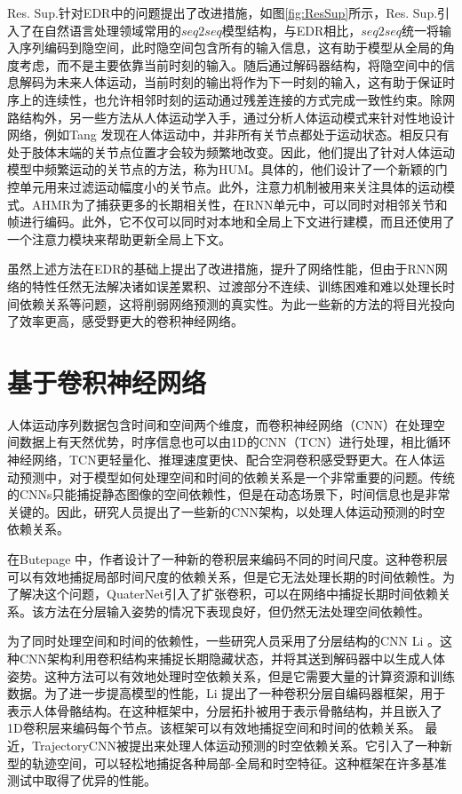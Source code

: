 Res. Sup.\parencite{martinez2017human}针对EDR中的问题提出了改进措施，如图\ref{fig:ResSup}所示，Res. Sup.引入了在自然语言处理领域常用的$seq2seq$模型结构，与EDR相比，$seq2seq$统一将输入序列编码到隐空间，此时隐空间包含所有的输入信息，这有助于模型从全局的角度考虑，而不是主要依靠当前时刻的输入。随后通过解码器结构，将隐空间中的信息解码为未来人体运动，当前时刻的输出将作为下一时刻的输入，这有助于保证时序上的连续性，也允许相邻时刻的运动通过残差连接的方式完成一致性约束。除网路结构外，另一些方法从人体运动学入手，通过分析人体运动模式来针对性地设计网络，例如Tang \etal \parencite{tang2018long}发现在人体运动中，并非所有关节点都处于运动状态。相反只有处于肢体末端的关节点位置才会较为频繁地改变。因此，他们提出了针对人体运动模型中频繁运动的关节点的方法，称为HUM。具体的，他们设计了一个新颖的门控单元用来过滤运动幅度小的关节点。此外，注意力机制被用来关注具体的运动模式。AHMR\parencite{liu2022investigating}为了捕获更多的长期相关性，在RNN单元中，可以同时对相邻关节和帧进行编码。此外，它不仅可以同时对本地和全局上下文进行建模，而且还使用了一个注意力模块来帮助更新全局上下文。

虽然上述方法在EDR的基础上提出了改进措施，提升了网络性能，但由于RNN网络的特性任然无法解决诸如误差累积、过渡部分不连续、训练困难和难以处理长时间依赖关系等问题，这将削弱网络预测的真实性。为此一些新的方法的将目光投向了效率更高，感受野更大的卷积神经网络。

\section{基于卷积神经网络}
人体运动序列数据包含时间和空间两个维度，而卷积神经网络（CNN）在处理空间数据上有天然优势，时序信息也可以由1D的CNN（TCN\cite{oord2016wavenet}）进行处理，相比循环神经网络，TCN更轻量化、推理速度更快、配合空洞卷积\cite{yu2017dilated}感受野更大。在人体运动预测中，对于模型如何处理空间和时间的依赖关系是一个非常重要的问题。传统的CNNs只能捕捉静态图像的空间依赖性，但是在动态场景下，时间信息也是非常关键的。因此，研究人员提出了一些新的CNN架构，以处理人体运动预测的时空依赖关系。

在Butepage \etal \parencite{butepage2017deep}中，作者设计了一种新的卷积层来编码不同的时间尺度。这种卷积层可以有效地捕捉局部时间尺度的依赖关系，但是它无法处理长期的时间依赖性。为了解决这个问题，QuaterNet\parencite{pavllo2018quaternet}引入了扩张卷积，可以在网络中捕捉长期时间依赖关系。该方法在分层输入姿势的情况下表现良好，但仍然无法处理空间依赖性。

为了同时处理空间和时间的依赖性，一些研究人员采用了分层结构的CNN Li \etal \parencite{li2018convolutional}。这种CNN架构利用卷积结构来捕捉长期隐藏状态，并将其送到解码器中以生成人体姿势。这种方法可以有效地处理时空依赖关系，但是它需要大量的计算资源和训练数据。为了进一步提高模型的性能，Li \etal \parencite{li2019efficient}提出了一种卷积分层自编码器框架，用于表示人体骨骼结构。在这种框架中，分层拓扑被用于表示骨骼结构，并且嵌入了1D卷积层来编码每个节点。该框架可以有效地捕捉空间和时间的依赖关系。
最近，TrajectoryCNN\parencite{liu2020trajectorycnn}被提出来处理人体运动预测的时空依赖关系。它引入了一种新型的轨迹空间，可以轻松地捕捉各种局部-全局和时空特征。这种框架在许多基准测试中取得了优异的性能。

